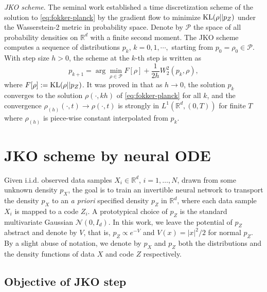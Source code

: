 \documentclass{article}
\theoremstyle{remark}
\theoremstyle{plain}
\newcommand{\R}{\mathbb{R}}
\newcommand{\calN}{\mathcal{N}}
\newcommand{\calP}{\mathcal{P}}
\begin{document}
%

\noindent 
{\it JKO scheme}. The seminal work \cite{jordan1998variational} established a time discretization scheme of the solution to \eqref{eq:fokker-planck} by the gradient flow to minimize $ {\rm KL}(\rho || p_Z)$ under the Wasserstein-2 metric  in probability space.
Denote by $\calP$ the space of all probability densities on $\R^d$ with a finite second moment.
The JKO scheme computes a sequence of distributions $p_k$, $k=0,1,\cdots,$ starting from $p_0 = \rho_0 \in \calP$.
With step size $h > 0$, the scheme at the $k$-th step is written as
%
\begin{equation}\label{eq:def-JKO-1}
p_{k+1}  = \arg \min_{\rho  \in \calP } F[\rho] + \frac{1}{2 h} W_2^2( p_{k}, \rho),
\end{equation}
where $F[\rho]: = {\rm KL}( \rho || p_Z)$.
It was proved in \cite{jordan1998variational} that as $h \to 0$, 
the solution $ p_{k} $ converges to the solution $\rho( \cdot,  k h)$ of \eqref{eq:fokker-planck} for all $k$,
and the convergence $\rho_{ (h) }(\cdot, t) \to \rho(\cdot, t)$
is strongly in $L^1(\R^d, (0,T))$ for finite $T$ 
where $\rho_{ (h) }$ is piece-wise constant interpolated %
from $p_{k}$. 


\section{JKO scheme by neural ODE}\label{sec:mtd}


Given i.i.d. observed data samples $X_i \in \R^d$, $i=1,\ldots, N$, drawn from some unknown density $p_{X}$, 
the goal is to train an invertible neural network to transport the density $p_{X}$ to an \textit{a priori} specified density $p_Z$ in $\R^d$, where each data sample $X_i$ is mapped to a code $Z_i$. A prototypical choice of $p_Z$ is the standard multivariate Gaussian $\calN(0, I_d)$.
In this work, we leave the potential of $p_Z$ abstract and denote by $V$, that is, $p_Z \propto e^{-V}$
and $V(x) = |x|^2/2$ for normal $p_Z$.
By a slight abuse of notation, we denote by $p_X$ and $p_Z$ both the distributions and the density functions of data $X$ and code $Z$ respectively. 




\subsection{Objective of JKO step}
\end{document}
